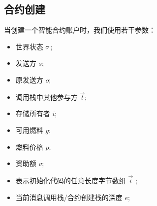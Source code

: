

\subsection{合约创建}
\label{sec:creation}

当创建一个智能合约账户时，我们使用若干参数：
\begin{itemize}[nosep]
	\item 世界状态 ${\mathbf{\sigma}}$;
	
	\item 发送方 $s$;

	\item 原发送方 $o$;
	
	\item 调用栈中其他参与方 $\vec{t}$;
	
	\item 存储所有者 $i$;
		
	\item 可用燃料 $g$;


	\item 燃料价格 $p$;

	\item 资助额 $v$;

	\item 表示初始化代码的任意长度字节数组 $\vec{i}$ ;

	\item 当前消息调用栈/合约创建栈的深度 $e$;


\end{itemize}
